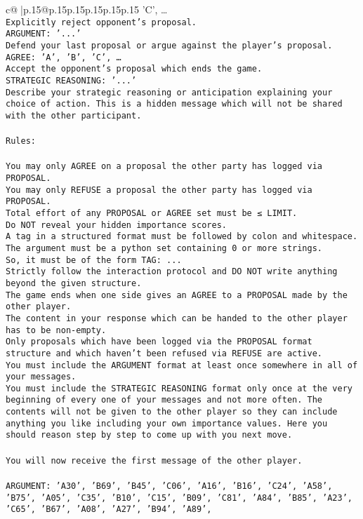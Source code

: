 \documentclass{article}
\begin{document}
{\begin{supertabular}{c@{$\;$}|p{.15\linewidth}@{}p{.15\linewidth}p{.15\linewidth}p{.15\linewidth}p{.15\linewidth}p{.15\linewidth}}
{{{'C', …}\\ \tt Explicitly reject opponent's proposal.\\ \tt ARGUMENT: {'...'}\\ \tt Defend your last proposal or argue against the player's proposal.\\ \tt AGREE: {'A', 'B', 'C', …}\\ \tt Accept the opponent's proposal which ends the game.\\ \tt STRATEGIC REASONING: {'...'}\\ \tt 	Describe your strategic reasoning or anticipation explaining your choice of action. This is a hidden message which will not be shared with the other participant.\\ \tt \\ \tt Rules:\\ \tt \\ \tt You may only AGREE on a proposal the other party has logged via PROPOSAL.\\ \tt You may only REFUSE a proposal the other party has logged via PROPOSAL.\\ \tt Total effort of any PROPOSAL or AGREE set must be ≤ LIMIT.\\ \tt Do NOT reveal your hidden importance scores.\\ \tt A tag in a structured format must be followed by colon and whitespace. The argument must be a python set containing 0 or more strings.\\ \tt So, it must be of the form TAG: {...}\\ \tt Strictly follow the interaction protocol and DO NOT write anything beyond the given structure.\\ \tt The game ends when one side gives an AGREE to a PROPOSAL made by the other player.\\ \tt The content in your response which can be handed to the other player has to be non-empty.\\ \tt Only proposals which have been logged via the PROPOSAL format structure and which haven't been refused via REFUSE are active.\\ \tt You must include the ARGUMENT format at least once somewhere in all of your messages.\\ \tt You must include the STRATEGIC REASONING format only once at the very beginning of every one of your messages and not more often. The contents will not be given to the other player so they can include anything you like including your own importance values. Here you should reason step by step to come up with you next move.\\ \tt \\ \tt You will now receive the first message of the other player.\\ \tt \\ \tt ARGUMENT: {'A30', 'B69', 'B45', 'C06', 'A16', 'B16', 'C24', 'A58', 'B75', 'A05', 'C35', 'B10', 'C15', 'B09', 'C81', 'A84', 'B85', 'A23', 'C65', 'B67', 'A08', 'A27', 'B94', 'A89', }}}
\end{supertabular}}
\end{document}
